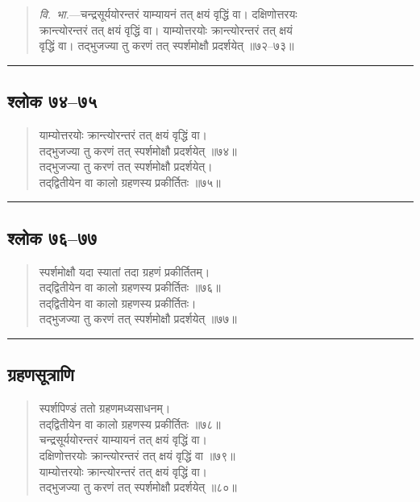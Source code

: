 \documentclass[11pt,a4paper]{article}
\newcommand{\longline}{\noindent\rule{\textwidth}{0.4pt}}
\newcommand{\dev}[1]{{\devanagarifont #1}}
\newenvironment{shloka}{%
  \begin{quote}
  \small
  \setlength{\leftmargin}{2em}
  \devanagarifont
}{\end{quote}}
\newenvironment{vyakhya}{%
  \begin{quote}
  \small
  \setlength{\leftmargin}{1em}
  \devanagarifont
}{\end{quote}}
\newcommand{\skt}[1]{{\devanagarifont #1}}
\begin{document}
\begin{vyakhya}
\textit{वि.\ भा.}—\skt{चन्द्रसूर्ययोरन्तरं याम्यायनं तत् क्षयं वृद्धिं वा। दक्षिणोत्तरयः}\\
\skt{क्रान्त्योरन्तरं तत् क्षयं वृद्धिं वा। याम्योत्तरयोः क्रान्त्योरन्तरं तत् क्षयं}\\
\skt{वृद्धिं वा। तद्‌भुजज्या तु करणं तत् स्पर्शमोक्षौ प्रदर्शयेत् ॥७२--७३॥}
\end{vyakhya}

\longline

\subsection{\dev{श्लोक ७४--७५}}

\begin{shloka}
\skt{याम्योत्तरयोः क्रान्त्योरन्तरं तत् क्षयं वृद्धिं वा।}\\
\skt{तद्‌भुजज्या तु करणं तत् स्पर्शमोक्षौ प्रदर्शयेत् ॥७४॥}\\[0.3em]
\skt{तद्‌भुजज्या तु करणं तत् स्पर्शमोक्षौ प्रदर्शयेत्।}\\
\skt{तद्‌द्वितीयेन वा कालो ग्रहणस्य प्रकीर्तितः ॥७५॥}
\end{shloka}

\longline

\subsection{\dev{श्लोक ७६--७७}}

\begin{shloka}
\skt{स्पर्शमोक्षौ यदा स्यातां तदा ग्रहणं प्रकीर्तितम्।}\\
\skt{तद्‌द्वितीयेन वा कालो ग्रहणस्य प्रकीर्तितः ॥७६॥}\\[0.3em]
\skt{तद्‌द्वितीयेन वा कालो ग्रहणस्य प्रकीर्तितः।}\\
\skt{तद्‌भुजज्या तु करणं तत् स्पर्शमोक्षौ प्रदर्शयेत् ॥७७॥}
\end{shloka}

\longline

\subsection{\dev{ग्रहणसूत्राणि}}

\begin{shloka}
\skt{स्पर्शपिण्डं ततो ग्रहणमध्यसाधनम्।}\\
\skt{तद्‌द्वितीयेन वा कालो ग्रहणस्य प्रकीर्तितः ॥७८॥}\\[0.3em]
\skt{चन्द्रसूर्ययोरन्तरं याम्यायनं तत् क्षयं वृद्धिं वा।}\\
\skt{दक्षिणोत्तरयोः क्रान्त्योरन्तरं तत् क्षयं वृद्धिं वा ॥७९॥}\\[0.3em]
\skt{याम्योत्तरयोः क्रान्त्योरन्तरं तत् क्षयं वृद्धिं वा।}\\
\skt{तद्‌भुजज्या तु करणं तत् स्पर्शमोक्षौ प्रदर्शयेत् ॥८०॥}
\end{shloka}
\end{document}

